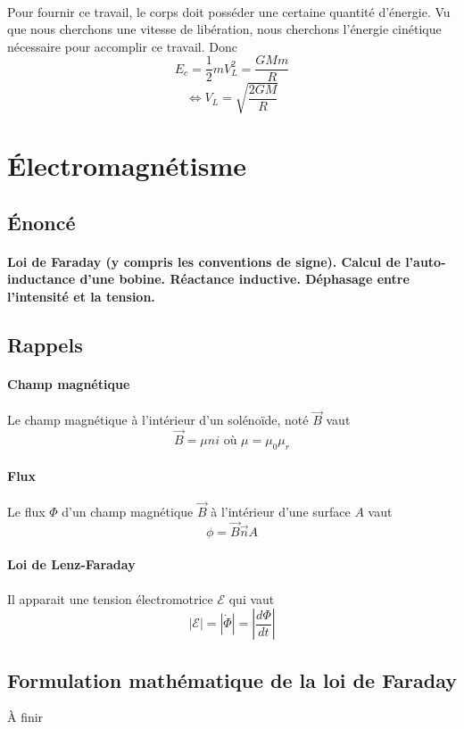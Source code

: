 \documentclass[a4paper]{article}
\begin{document}
\paragraph{}Pour fournir ce travail, le corps doit posséder une certaine quantité d'énergie. Vu que nous cherchons une vitesse de libération, nous cherchons l'énergie cinétique nécessaire pour accomplir ce travail. Donc
\[E_c=\frac{1}{2}mV_L^2=\frac{GMm}{R}\]
\[\Leftrightarrow V_L=\sqrt{\frac{2GM}{R}}\]
\section{Électromagnétisme}
\subsection{Énoncé}
\paragraph{}\textbf{Loi de Faraday (y compris les conventions de signe). Calcul de l'auto-inductance d'une bobine. Réactance inductive. Déphasage entre l'intensité et la tension.}
\subsection{Rappels}
\paragraph{Champ magnétique}Le champ magnétique à l'intérieur d'un solénoïde, noté $\vec{B}$ vaut
\[\vec{B}=\mu n i\text{ où } \mu=\mu_0\mu_r\]
\paragraph{Flux}Le flux $\Phi$ d'un champ magnétique $\vec{B}$ à l'intérieur d'une surface $A$ vaut
\[\phi=\vec{B}\vec{n}A\]
\paragraph{Loi de Lenz-Faraday}Il apparait une tension électromotrice $\mathscr{E}$ qui vaut
\[\left|\mathscr{E}\right|=\left|\dot{\Phi}\right|=\left|\frac{d\Phi}{dt}\right|\]
\subsection{Formulation mathématique de la loi de Faraday}
\begin{center}\Huge{À finir}\end{center}
\end{document}
